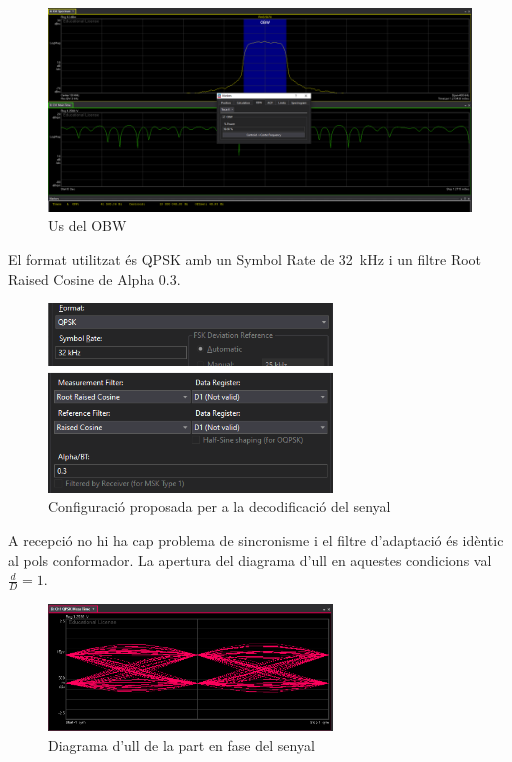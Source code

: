 \documentclass[catalan, a4paper, nobib]{tufte-handout}
\begin{document}
\begin{figure}
    \begin{center}
        \includegraphics[width=445px]{p2_2.png}
    \end{center}
    \caption{Us del OBW}
    \label{fig:OBW}
\end{figure}


El format utilitzat és QPSK amb un Symbol Rate de \qty{32}{\kilo\hertz} i un filtre Root Raised Cosine de Alpha \num{0.3}.

\begin{figure}[!h]
    \begin{center}
        \includegraphics[width=285px]{p3.png}
    \end{center}
    \caption{Configuració proposada per a la decodificació del senyal}
\end{figure}

\newpage


A recepció no hi ha cap problema de sincronisme i el filtre d'adaptació és idèntic al pols conformador. La apertura del diagrama d'ull en aquestes condicions val $\frac{d}{D}=\num{1}$.

\begin{figure}[!h]
    \begin{center}
        \includegraphics[width=285px]{p4.png}
    \end{center}
    \caption{Diagrama d'ull de la part en fase del senyal}
\end{figure}
\end{document}
